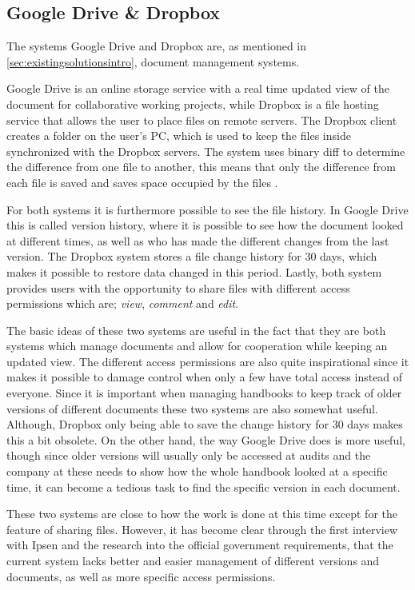 \subsection{Google Drive \& Dropbox}\label{sec:DropDrive}
The systems Google Drive and Dropbox are, as mentioned in \cref{sec:existingsolutionsintro}, document management systems.

Google Drive is an online storage service with a real time updated view of the document for collaborative working projects\cite{GoogleDriveContents}, while Dropbox is a file hosting service that allows the user to place files on remote servers.
The Dropbox client creates a folder on the user's PC, which is used to keep the files inside synchronized with the Dropbox servers.
The system uses binary diff to determine the difference from one file to another, this means that only the difference from each file is saved and saves space occupied by the files \cite{DropboxDiff}.

For both systems it is furthermore possible to see the file history.
In Google Drive this is called version history, where it is possible to see how the document looked at different times, as well as who has made the different changes from the last version.
The Dropbox system stores a file change history for 30 days, which makes it possible to restore data changed in this period. Lastly, both system provides users with the opportunity to share files with different access permissions which are; \textit{view}, \textit{comment} and \textit{edit}.\cite{DropboxContents,GoogleDriveContents} 

The basic ideas of these two systems are useful in the fact that they are both systems which manage documents and allow for cooperation while keeping an updated view.
The different access permissions are also quite inspirational since it makes it possible to damage control when only a few have total access instead of everyone.
Since it is important when managing handbooks to keep track of older versions of different documents these two systems are also somewhat useful.
Although, Dropbox only being able to save the change history for 30 days makes this a bit obsolete.
On the other hand, the way Google Drive does is more useful, though since older versions will usually only be accessed at audits and the company at these needs to show how the whole handbook looked at a specific time, it can become a tedious task to find the specific version in each document.\cite{DropboxContents,GoogleDriveContents}

These two systems are close to how the work is done at this time except for the feature of sharing files.
However, it has become clear through the first interview with Ipsen and the research into the official government requirements, that the current system lacks better and easier management of different versions and documents, as well as more specific access permissions.

